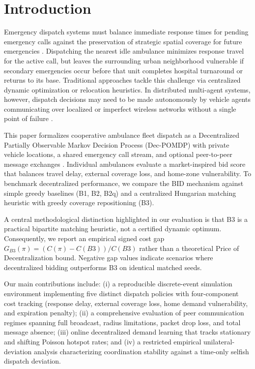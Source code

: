\documentclass{article}
\begin{document}

\section{Introduction}
Emergency dispatch systems must balance immediate response times for pending emergency calls against the preservation of strategic spatial coverage for future emergencies \cite{church1974,brotcorne2003,maxwell2010}. Dispatching the nearest idle ambulance minimizes response travel for the active call, but leaves the surrounding urban neighborhood vulnerable if secondary emergencies occur before that unit completes hospital turnaround or returns to its base. Traditional approaches tackle this challenge via centralized dynamic optimization or relocation heuristics. In distributed multi-agent systems, however, dispatch decisions may need to be made autonomously by vehicle agents communicating over localized or imperfect wireless networks without a single point of failure \cite{smith1980,matignon2012}.

This paper formalizes cooperative ambulance fleet dispatch as a Decentralized Partially Observable Markov Decision Process (Dec-POMDP) with private vehicle locations, a shared emergency call stream, and optional peer-to-peer message exchanges \cite{littman1994,bernstein2002,oliehoek2016}. Individual ambulances evaluate a market-inspired bid score that balances travel delay, external coverage loss, and home-zone vulnerability. To benchmark decentralized performance, we compare the BID mechanism against simple greedy baselines (B1, B2, B2q) and a centralized Hungarian matching heuristic with greedy coverage repositioning (B3).

A central methodological distinction highlighted in our evaluation is that B3 is a practical bipartite matching heuristic, not a certified dynamic optimum. Consequently, we report an empirical signed cost gap $G_{B3}(\pi) = (C(\pi) - C(B3))/C(B3)$ rather than a theoretical Price of Decentralization bound. Negative gap values indicate scenarios where decentralized bidding outperforms B3 on identical matched seeds. 

Our main contributions include: (i) a reproducible discrete-event simulation environment implementing five distinct dispatch policies with four-component cost tracking (response delay, external coverage loss, home demand vulnerability, and expiration penalty); (ii) a comprehensive evaluation of peer communication regimes spanning full broadcast, radius limitations, packet drop loss, and total message absence; (iii) online decentralized demand learning that tracks stationary and shifting Poisson hotspot rates; and (iv) a restricted empirical unilateral-deviation analysis characterizing coordination stability against a time-only selfish dispatch deviation.
\end{document}
